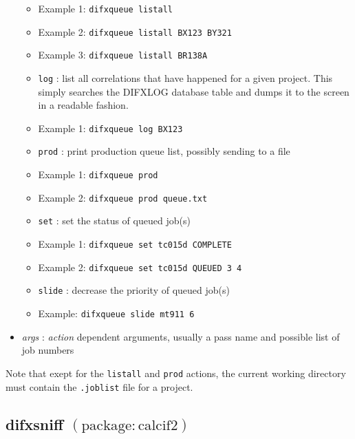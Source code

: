 \begin{itemize}
\begin{itemize}
\item[] Example 1: {\tt difxqueue listall}
\item[] Example 2: {\tt difxqueue listall BX123 BY321}
\item[] Example 3: {\tt difxqueue listall BR138A}
\vspace{5pt}
\item[] {\tt log} : list all correlations that have happened for a given project.  This simply searches the DIFXLOG database table and dumps it to the screen in a readable fashion.
\item[] Example 1: {\tt difxqueue log BX123}
\vspace{5pt}
\item[] {\tt prod} : print production queue list, possibly sending to a file
\item[] Example 1: {\tt difxqueue prod}
\item[] Example 2: {\tt difxqueue prod queue.txt}
\vspace{5pt}
\item[] {\tt set} : set the status of queued job(s)
\item[] Example 1: {\tt difxqueue set tc015d COMPLETE}
\item[] Example 2: {\tt difxqueue set tc015d QUEUED 3 4}
\vspace{5pt}
\item[] {\tt slide} : decrease the priority of queued job(s)
\item[] Example: {\tt difxqueue slide mt911 6}
\end{itemize}
\item[] {\em args} : {\em action} dependent arguments, usually a pass name and possible list of job numbers
\end{itemize}

Note that exept for the {\tt listall} and {\tt prod} actions, the current working directory must contain the {\tt .joblist} file for a project.







\subsection{difxsniff {\small $\mathrm{(package: calcif2)}$}} \label{sec:difxsniff}


